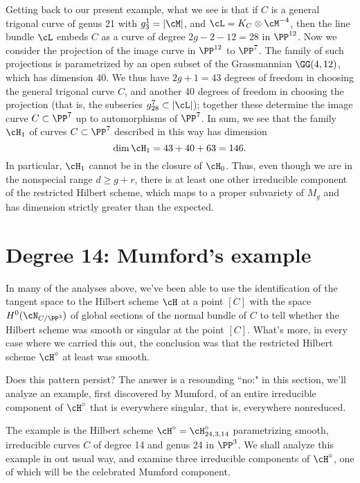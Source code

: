 Getting back to our present example, what we see is that if $C$ is a general trigonal curve of genus 21 with $g^1_3 = |\cM|$, and $\cL = K_C \otimes \cM^{-4}$, then the line bundle $\cL$ embeds $C$ as a curve of degree $2g-2-12 = 28$ in $\PP^{12}$. Now we consider the projection of the image curve in $\PP^{12}$ to $\PP^7$. The  family of such projections is parametrized by an open subset of the Grassmannian $\GG(4, 12)$, which has dimension 40. We thus have $2g+1 = 43$ degrees of freedom in choosing the general trigonal curve $C$, and another 40 degrees of freedom in choosing the projection (that is, the subseries $g^7_{28} \subset |\cL|$); together these determine the image curve $C \subset \PP^7$ up to automorphisms of $\PP^7$. In sum, we see that the family $\cH_1$ of curves $C \subset \PP^7$ described in this way has dimension
$$
\dim \cH_1 = 43 + 40 + 63 = 146.
$$
In particular, $\cH_1$ cannot be in the closure of $\cH_0$. Thus, even though we are in the nonspecial range $d \geq g+r$, there is at least one other irreducible component of the restricted Hilbert scheme, which maps to a proper subvariety of $M_g$ and has dimension strictly greater than the expected.


\section{Degree 14: Mumford's example}\label{mumford example}

In many of the analyses above, we've been able to use the identification of the tangent space to the Hilbert scheme $\cH$ at a point $[C]$ with the space $H^0(\cN_{C/\PP^3})$ of global sections of the normal bundle of $C$ to tell whether the Hilbert scheme was smooth or singular at the point $[C]$. What's more, in every case where we carried this out, the conclusion was that the restricted Hilbert scheme $\cH^\circ$ at least was smooth.

Does this pattern persist? The answer is a resounding ``no:" in this section, we'll analyze an example, first discovered by Mumford, of an entire irreducible component of $\cH^\circ$ that is everywhere singular, that is, everywhere nonreduced.


The example is the  Hilbert scheme
$\cH^\circ = \cH^\circ_{24,3,14}$ parametrizing smooth, irreducible curves $C$ of degree 14 and genus 24 in $\PP^3$. We shall analyze this example in out usual way, and examine three irreducible components of $\cH^\circ$, one of which will be the celebrated Mumford component. 

